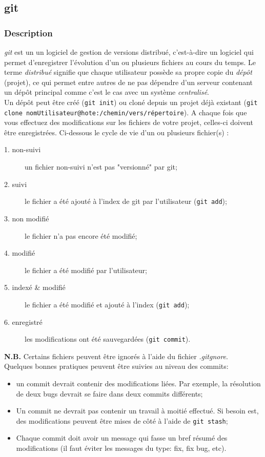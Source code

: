 \subsection*{git}
\subsubsection*{Description}
\emph{git} est un un logiciel de gestion de versions distribué, c'est-à-dire un logiciel qui permet d'enregistrer l'évolution d'un ou plusieurs fichiers au cours  du temps. Le terme \emph{distribué} signifie que chaque utilisateur possède sa propre copie du \emph{dépôt} (projet), ce qui permet entre autres de ne pas dépendre d'un serveur contenant un dépôt principal comme c'est le cas avec un système \emph{centralisé}.\\

Un dépôt peut être créé (\lstinline{git init}) ou cloné depuis un projet déjà existant (\lstinline{git clone nomUtilisateur@hote:/chemin/vers/répertoire}). A chaque fois que vous effectuez des modifications sur les fichiers de votre projet, celles-ci doivent être enregistrées. Ci-dessous le cycle de vie d'un ou plusieurs fichier(s) :
\begin{description}
\item[1. non-suivi] un fichier non-suivi n'est pas "versionné" par git;
\item[2. suivi] le fichier a été ajouté à l'index de git par l'utilisateur (\lstinline{git add});
\item[3. non modifié] le fichier n'a pas encore été modifié;
\item[4. modifié] le fichier a été modifié par l'utilisateur;
\item[5. indexé \& modifié] le fichier a été modifié et ajouté à l'index (\lstinline{git add});
\item[6. enregistré] les modifications ont été sauvegardées (\lstinline{git commit}).
\end{description}
\textbf{N.B.} Certains fichiers peuvent être ignorés à l'aide du fichier \emph{.gitgnore}.\\

\noindent Quelques bonnes pratiques peuvent être suivies au niveau des commits:
\begin{itemize}
\item un commit devrait contenir des modifications liées. Par exemple, la résolution de deux bugs devrait se faire dans deux commits différents;
\item Un commit ne devrait pas contenir un travail à moitié effectué. Si besoin est, des modifications peuvent être mises de côté à l'aide de \lstinline{git stash};
\item Chaque commit doit avoir un message qui fasse un bref résumé des modifications (il faut éviter les messages du type: fix, fix bug, etc).
\end{itemize}
\hfill{}

